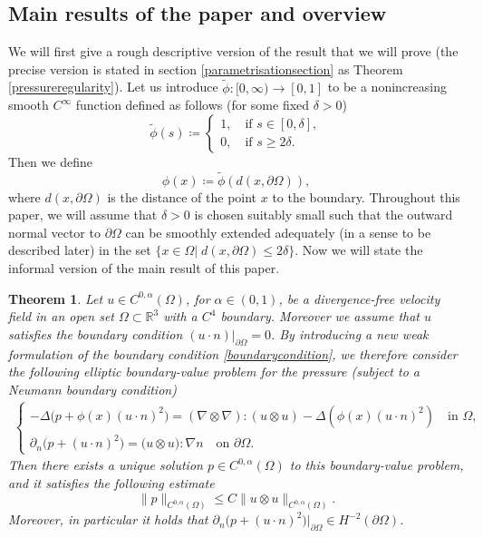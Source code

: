 \documentclass[12pt,a4paper]{article}
\newtheorem{theorem}{Theorem}[section]
\theoremstyle{definition}
\theoremstyle{remark}
\numberwithin{equation}{section}
\begin{document}
\subsection{Main results of the paper and overview}
We will first give a rough descriptive version of the result that we will prove (the precise version is stated in section \ref{parametrisationsection} as Theorem \ref{pressureregularity}). Let us introduce $\widetilde{\phi} : [0, \infty) \rightarrow [0,1]$ to be a nonincreasing smooth $C^\infty$ function defined as follows (for some fixed $\delta > 0$)
\begin{equation} \label{phifunction}
\widetilde{\phi} (s) \coloneqq \begin{cases}
1, \quad \text{if } s \in [0,\delta], \\
0, \quad \text{if } s \geq 2 \delta.
\end{cases}
\end{equation}
Then we define
\begin{equation}
\phi (x) \coloneqq \widetilde{\phi} (d(x, \partial \Omega)),
\end{equation}
where $d(x, \partial \Omega)$ is the distance of the point $x$ to the boundary.
Throughout this paper, we will assume that $\delta > 0$ is chosen suitably small such that the outward normal vector to $\partial \Omega$ can be smoothly extended adequately (in a sense to be described later) in the set $\{ x \in \Omega \lvert \; d (x, \partial \Omega) \leq 2 \delta \}$. Now we will state the informal version of the main result of this paper.
\begin{theorem} \label{regularitytheorem}
Let $u \in C^{0, \alpha} (\Omega)$, for $\alpha \in (0,1)$, be a divergence-free velocity field in an open set $\Omega \subset \mathbb{R}^3$ with a $C^4$ boundary. Moreover we assume that $u$ satisfies the boundary condition $(u \cdot n ) \lvert_{\partial \Omega} = 0$. By introducing a new weak formulation of the boundary condition \eqref{boundarycondition}, we therefore consider the following elliptic boundary-value problem for the pressure (subject to a Neumann boundary condition)
\begin{align}
\begin{cases}
-\Delta \big( p + \phi (x) (u \cdot n)^2 \big) = (\nabla \otimes \nabla) : (u \otimes u) - \Delta ( \phi (x) (u \cdot n)^2) \quad \text{in } \Omega, \\
\partial_n \big( p + (u \cdot n)^2 \big) = \big( u \otimes u \big) : \nabla n \quad \text{on } \partial \Omega.
\end{cases} \label{neumannpressureproblem}
\end{align}
Then there exists a unique solution $p \in C^{0,\alpha} (\Omega)$ to this boundary-value problem, and it satisfies the following estimate
\begin{equation} \label{regularityestimate}
\lVert p \rVert_{C^{0, \alpha} (\Omega)} \leq C \lVert u \otimes u \rVert_{C^{0, \alpha} (\Omega)}.
\end{equation}
Moreover, in particular it holds that $\partial_n \big(p + (u \cdot n)^2 \big) \lvert_{\partial \Omega} \in H^{-2} (\partial \Omega)$.
\end{theorem}
\end{document}

